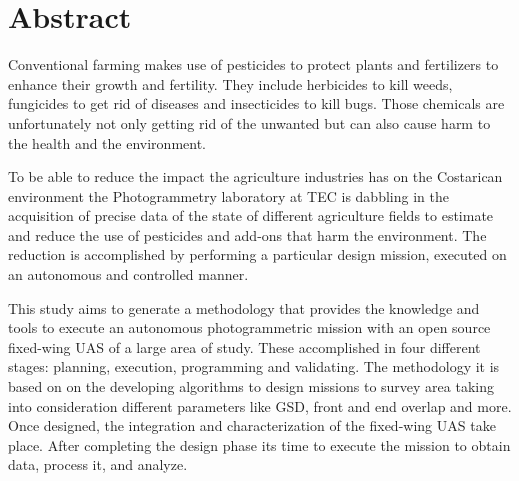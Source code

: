 \section{Abstract}
Conventional farming makes use of pesticides to protect plants and fertilizers to enhance their growth and fertility. They include herbicides to kill weeds, fungicides to get rid of diseases and insecticides to kill bugs. Those chemicals are unfortunately not only getting rid of the unwanted but can also cause harm to the health and the environment.

To be able to reduce the impact the agriculture industries has on the Costarican environment the Photogrammetry laboratory at TEC is dabbling in the acquisition of precise data of the state of different agriculture fields to estimate and reduce the use of pesticides and add-ons that harm the environment. The reduction is accomplished by performing a particular design mission, executed on an autonomous and controlled manner.

This study aims to generate a methodology that provides the knowledge and tools to execute an autonomous photogrammetric mission with an open source fixed-wing UAS of a large area of study. These accomplished in four different stages: planning, execution, programming and validating. The methodology it is based on on the developing algorithms to design missions to survey area taking into consideration different parameters like GSD, front and end overlap and more. Once designed, the integration and characterization of the fixed-wing UAS take place. After completing the design phase its time to execute the mission to obtain data,  process it, and analyze.